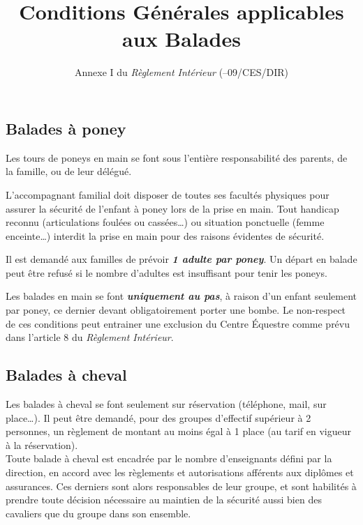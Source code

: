 \documentclass[11pt,a4paper]{article}
\title[Conditions Générales applicables aux Balades \\ version du \today]{Conditions Générales applicables aux Balades}
\subtitle{Annexe I du \textit{Règlement Intérieur} (\no 24--09/CES/DIR)}
\author{}
\date{}
\renewcommand{\emph}[1]{\textit{\textbf{#1}}}
\begin{document}
   \maketitle

   \vspace{-30pt}

   \subsection*{Balades à poney}
      Les tours de poneys en main se font sous l'entière responsabilité des parents, de la famille, ou de leur délégué.

      L'accompagnant familial doit disposer de toutes ses facultés physiques pour assurer la sécurité de l'enfant à poney lors de la prise en main.
      Tout handicap reconnu (articulations foulées ou cassées\dots) ou situation ponctuelle (femme enceinte\dots) interdit la prise en main pour des raisons évidentes de sécurité.

      Il est demandé aux familles de prévoir \emph{1 adulte par poney}.
      Un départ en balade peut être refusé si le nombre d'adultes est insuffisant pour tenir les poneys.

      Les balades en main se font \emph{uniquement au pas}, à raison d'un enfant seulement par poney, ce dernier devant obligatoirement porter une bombe.
      Le non-respect de ces conditions peut entrainer une exclusion du Centre Équestre comme prévu dans l'article 8 du \textit{Règlement Intérieur}.

   \subsection*{Balades à cheval}
      Les balades à cheval se font seulement sur réservation (téléphone, mail, sur place\dots).
      Il peut être demandé, pour des groupes d'effectif supérieur à 2 personnes, un règlement de montant au moins égal à 1 place (au tarif en vigueur à la réservation).
      \\

      Toute balade à cheval est encadrée par le nombre d'enseignants défini par la direction, en accord avec les règlements et autorisations afférents aux diplômes et assurances.
      Ces derniers sont alors responsables de leur groupe, et sont habilités à prendre toute décision nécessaire au maintien de la sécurité aussi bien des cavaliers que du groupe dans son ensemble.
      \\
\end{document}
